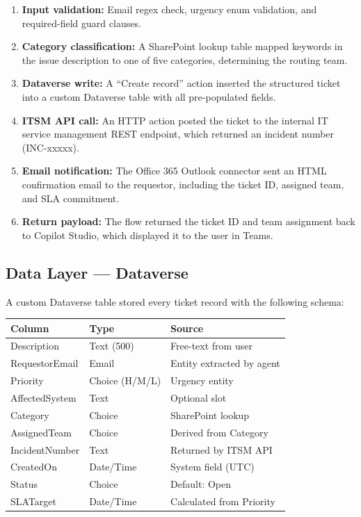\documentclass[12pt, a4paper]{article}
\begin{document}
\begin{enumerate}[leftmargin=*, label=\arabic*.]
  \item \textbf{Input validation:} Email regex check, urgency enum validation, and
        required-field guard clauses.
  \item \textbf{Category classification:} A SharePoint lookup table mapped keywords in
        the issue description to one of five categories, determining the routing team.
  \item \textbf{Dataverse write:} A ``Create record'' action inserted the structured
        ticket into a custom Dataverse table with all pre-populated fields.
  \item \textbf{ITSM API call:} An HTTP action posted the ticket to the internal IT
        service management REST endpoint, which returned an incident number (INC-xxxxx).
  \item \textbf{Email notification:} The Office 365 Outlook connector sent an HTML
        confirmation email to the requestor, including the ticket ID, assigned team,
        and SLA commitment.
  \item \textbf{Return payload:} The flow returned the ticket ID and team assignment
        back to Copilot Studio, which displayed it to the user in Teams.
\end{enumerate}

\subsection{Data Layer --- Dataverse}

A custom Dataverse table stored every ticket record with the following schema:

\begin{center}
\begin{tabular}{lll}
\toprule
\textbf{Column} & \textbf{Type} & \textbf{Source} \\
\midrule
Description & Text (500) & Free-text from user \\
RequestorEmail & Email & Entity extracted by agent \\
Priority & Choice (H/M/L) & Urgency entity \\
AffectedSystem & Text & Optional slot \\
Category & Choice & SharePoint lookup \\
AssignedTeam & Choice & Derived from Category \\
IncidentNumber & Text & Returned by ITSM API \\
CreatedOn & Date/Time & System field (UTC) \\
Status & Choice & Default: Open \\
SLATarget & Date/Time & Calculated from Priority \\
\bottomrule
\end{tabular}
\end{center}
\end{document}
